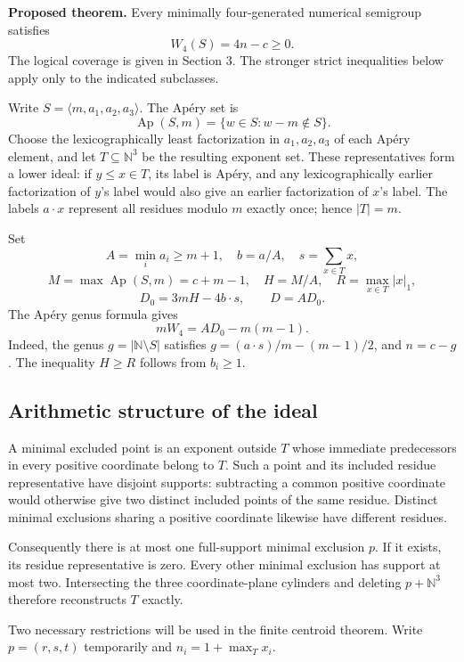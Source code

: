 \documentclass[
  11pt,
  a4paper,
]{article}
\begin{document}
\textbf{Proposed theorem.} Every minimally four-generated numerical
semigroup satisfies \[
W_4(S)=4n-c\ge0.
\] The logical coverage is given in Section 3. The stronger strict
inequalities below apply only to the indicated subclasses.

Write \(S=\langle m,a_1,a_2,a_3\rangle\). The Apéry set is \[
\operatorname{Ap}(S,m)=\{w\in S:w-m\notin S\}.
\] Choose the lexicographically least factorization in \(a_1,a_2,a_3\)
of each Apéry element, and let \(T\subseteq\mathbb N^3\) be the
resulting exponent set. These representatives form a lower ideal: if
\(y\le x\in T\), its label is Apéry, and any lexicographically earlier
factorization of \(y\)'s label would also give an earlier factorization
of \(x\)'s label. The labels \(a\cdot x\) represent all residues modulo
\(m\) exactly once; hence \(|T|=m\).

Set \[
A=\min_i a_i\ge m+1,\quad b=a/A,\quad s=\sum_{x\in T}x,
\] \[
M=\max\operatorname{Ap}(S,m)=c+m-1,\quad H=M/A,\quad
R=\max_{x\in T}|x|_1,
\] \[
D_0=3mH-4b\cdot s,\qquad D=AD_0.
\] The Apéry genus formula gives \[
\boxed{mW_4=AD_0-m(m-1).} \tag{G1}
\] Indeed, the genus \(g=|\mathbb N\setminus S|\) satisfies
\(g=(a\cdot s)/m-(m-1)/2\), and \(n=c-g\). The inequality \(H\ge R\)
follows from \(b_i\ge1\).

\hypertarget{arithmetic-structure-of-the-ideal}{%
\subsection{Arithmetic structure of the
ideal}\label{arithmetic-structure-of-the-ideal}}

A minimal excluded point is an exponent outside \(T\) whose immediate
predecessors in every positive coordinate belong to \(T\). Such a point
and its included residue representative have disjoint supports:
subtracting a common positive coordinate would otherwise give two
distinct included points of the same residue. Distinct minimal
exclusions sharing a positive coordinate likewise have different
residues.

Consequently there is at most one full-support minimal exclusion \(p\).
If it exists, its residue representative is zero. Every other minimal
exclusion has support at most two. Intersecting the three
coordinate-plane cylinders and deleting \(p+\mathbb N^3\) therefore
reconstructs \(T\) exactly.

Two necessary restrictions will be used in the finite centroid theorem.
Write \(p=(r,s,t)\) temporarily and \(n_i=1+\max_Tx_i\).
\end{document}
